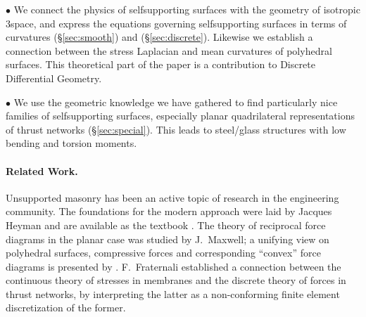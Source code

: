 \documentclass[annual]{acmsiggraph}
\newcommand{\secref}[1]{(\S\ref{#1})}
\begin{document}
$\bullet$ We connect the physics of self\dash supporting surfaces with
the geometry of isotropic 3\dash space, and express the
equations governing self\dash supporting surfaces in terms of curvatures
\secref{sec:smooth} and \secref{sec:discrete}.
Likewise we establish a connection between the stress Laplacian and
mean curvatures of polyhedral surfaces. This theoretical part of the
paper is a contribution to Discrete Differential Geometry.


$\bullet$ We use the geometric knowledge we have gathered to 
find particularly nice families of self\dash supporting surfaces,
especially planar quadrilateral representations of thrust networks
\secref{sec:special}. This leads to steel\slash glass structures
with low bending and torsion moments.



\paragraph{Related Work.}

Unsupported masonry has been an active topic of research in the
engineering community. The foundations for the modern approach were laid
by Jacques Heyman  and are available as the textbook
\cite{Heyman95}. The theory of reciprocal force diagrams in the planar
case was studied by J.~Maxwell;
a unifying view on polyhedral surfaces, compressive
forces and corresponding ``convex'' force diagrams is presented by
\cite{Ash1988}. F.~Fraternali  established a connection between the continuous
theory of stresses in membranes and the discrete theory of forces in
thrust networks, by interpreting the latter as a non-conforming
finite element discretization of the former.
\end{document}
